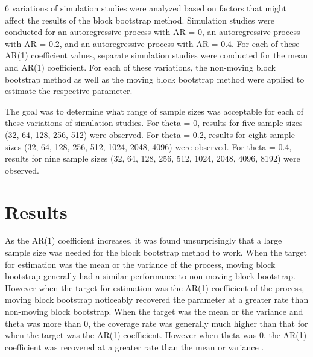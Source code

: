 \documentclass[12pt, letterpaper, titlepage]{article}
\begin{document}
6 variations of simulation studies were analyzed based on factors that might affect the results of the block bootstrap method. Simulation studies were conducted for an autoregressive process with AR = 0, an autoregressive process with AR = 0.2, and an autoregressive process with AR = 0.4. For each of these AR(1) coefficient values, separate simulation studies were conducted for the mean and AR(1) coefficient. For each of these variations, the non-moving block bootstrap method as well as the moving block bootstrap method were applied to estimate the respective parameter. 

The goal was to determine what range of sample sizes was acceptable for each of these variations of simulation studies. For theta = 0, results for five sample sizes (32, 64, 128, 256, 512) were observed. For theta = 0.2, results for eight sample sizes (32,  64, 128, 256, 512, 1024, 2048, 4096) were observed. For theta = 0.4, results for nine sample sizes (32, 64, 128, 256, 512, 1024, 2048, 4096, 8192) were observed.



 

\section{Results}
\label{sec:results}

As the AR(1) coefficient increases, it was found unsurprisingly that a large sample size was needed for the block bootstrap method to work. When the target for estimation was the mean or the variance of the process, moving block bootstrap generally had a similar performance to non-moving block bootstrap. However when the target for estimation was the AR(1) coefficient of the process, moving block bootstrap noticeably recovered the parameter at a greater rate than non-moving block bootstrap. When the target was the mean or the variance and theta was more than 0, the coverage rate was generally much higher than that for when the target was the AR(1) coefficient. However when theta was 0, the AR(1) coefficient was recovered at a greater rate than the mean or variance . 
\end{document}
